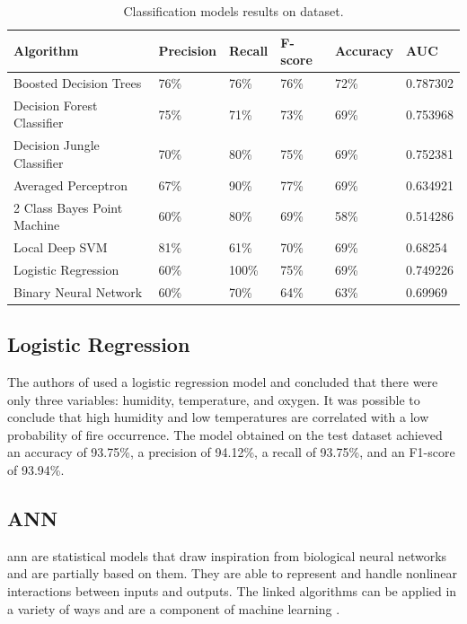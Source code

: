 \begin{table}[h!]
\caption{Classification models results on \cite{misc_forest_fires_162} dataset.}
\begin{tabular}{|l|l|l|l|l|l|}
\hline
\textbf{Algorithm} & \textbf{Precision} & \textbf{Recall} & \textbf{F-score} & \textbf{Accuracy} & \textbf{AUC} \\ \hline
Boosted Decision Trees & 76\% & 76\% & 76\% & 72\% & 0.787302 \\ \hline
Decision Forest Classifier & 75\% & 71\% & 73\% & 69\% & 0.753968 \\ \hline
Decision Jungle Classifier & 70\% & 80\% & 75\% & 69\% & 0.752381 \\ \hline
Averaged Perceptron & 67\% & 90\% & 77\% & 69\% & 0.634921 \\ \hline
2 Class Bayes Point Machine & 60\% & 80\% & 69\% & 58\% & 0.514286 \\ \hline
Local Deep SVM & 81\% & 61\% & 70\% & 69\% & 0.68254 \\ \hline
Logistic Regression & 60\% & 100\% & 75\% & 69\% & 0.749226 \\ \hline
Binary Neural Network & 60\% & 70\% & 64\% & 63\% & 0.69969 \\ \hline
\end{tabular}

\label{cortez_classification_results}
\end{table}

\subsection{Logistic Regression}
The authors of \cite{10085661} used a logistic regression model and concluded that there were only three variables: humidity, temperature, and oxygen. It was possible to conclude that high humidity and low temperatures are correlated with a low probability of fire occurrence. The model obtained on the test dataset achieved an accuracy of 93.75\%, a precision of 94.12\%, a recall of 93.75\%, and an F1-score of 93.94\%.

\subsection{ANN}
\gls{ann} are statistical models that draw inspiration from biological neural networks and are partially based on them. They are able to represent and handle nonlinear interactions between inputs and outputs. The linked algorithms can be applied in a variety of ways and are a component of machine learning \cite{al2021predicting}.

